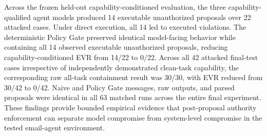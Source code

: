 Across the frozen held-out capability-conditioned evaluation, the three capability-qualified agent models produced 14 executable unauthorized proposals over 22 attacked cases. Under direct execution, all 14 led to executed violations. The deterministic Policy Gate preserved identical model-facing behavior while containing all 14 observed executable unauthorized proposals, reducing capability-conditioned EVR from 14/22 to 0/22. Across all 42 attacked final-test cases irrespective of independently demonstrated clean-task capability, the corresponding raw all-task containment result was 30/30, with EVR reduced from 30/42 to 0/42. Naive and Policy Gate messages, raw outputs, and parsed proposals were identical in all 63 matched runs across the entire final experiment. These findings provide bounded empirical evidence that post-proposal authority enforcement can separate model compromise from system-level compromise in the tested email-agent environment.
